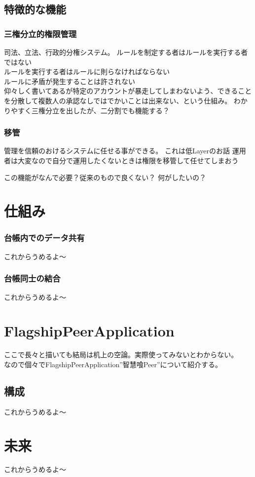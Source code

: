\documentclass[10pt,a4paper]{jarticle}
\begin{document}
\begin{multicols}{2}
\subsection{特徴的な機能}

\subsubsection{三権分立的権限管理}
司法、立法、行政的分権システム。
ルールを制定する者はルールを実行する者ではない\\
ルールを実行する者はルールに則らなければならない\\
ルールに矛盾が発生することは許されない\\

仰々しく書いてあるが特定のアカウントが暴走してしまわないよう、できることを分散して複数人の承認なしではでかいことは出来ない、という仕組み。
わかりやすく三権分立を出したが、二分割でも機能する？

\subsubsection{移管}
管理を信頼のおけるシステムに任せる事ができる。
これは低Layerのお話
運用者は大変なので自分で運用したくないときは権限を移管して任せてしまおう

この機能がなんで必要？従来のもので良くない？
何がしたいの？


\section{仕組み}

\subsubsection{台帳内でのデータ共有}
これからうめるよ〜

\subsubsection{台帳同士の結合}
これからうめるよ〜

\section{FlagshipPeerApplication}
ここで長々と描いても結局は机上の空論。実際使ってみないとわからない。\\
なので個々でFlagshipPeerApplication”智慧喰Peer”について紹介する。

\subsection{構成}
これからうめるよ〜


\section{未来}
これからうめるよ〜

\end{multicols}
\end{document}
